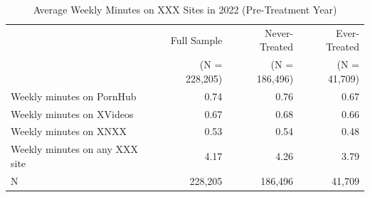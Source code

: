 \begin{table}[h!]
\centering
\caption{Average Weekly Minutes on XXX Sites in 2022 (Pre-Treatment Year)}
\label{tab:xxx_weekly_mins_2022}
\begin{tabular}{lrrr}
\toprule
 & Full Sample & Never-Treated & Ever-Treated \\
 & (N = 228,205) & (N = 186,496) & (N = 41,709) \\
\midrule
Weekly minutes on PornHub & 0.74 & 0.76 & 0.67 \\
Weekly minutes on XVideos & 0.67 & 0.68 & 0.66 \\
Weekly minutes on XNXX & 0.53 & 0.54 & 0.48 \\
Weekly minutes on any XXX site & 4.17 & 4.26 & 3.79 \\
\midrule
N & 228,205 & 186,496 & 41,709 \\
\bottomrule
\end{tabular}
\end{table}
